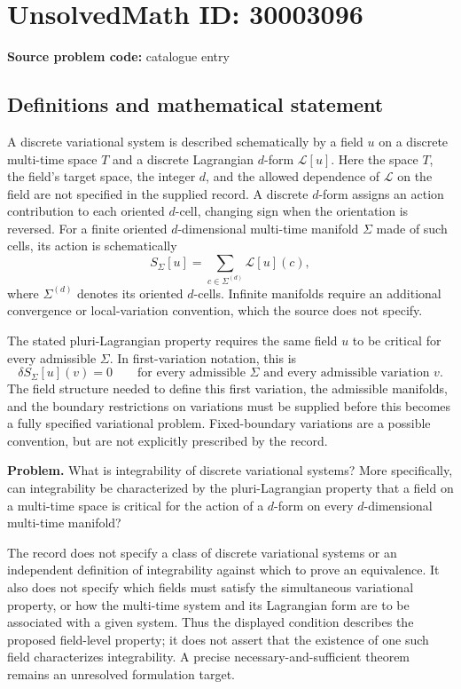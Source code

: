 \documentclass[11pt]{article}
\begin{document}
\section*{UnsolvedMath ID: 30003096}
\textbf{Source problem code:} catalogue entry
\subsection{Definitions and mathematical statement}
A discrete variational system is described schematically by a field \(u\) on a discrete multi-time space \(T\) and a discrete Lagrangian \(d\)-form \(\mathcal L[u]\). Here the space \(T\), the field's target space, the integer \(d\), and the allowed dependence of \(\mathcal L\) on the field are not specified in the supplied record. A discrete \(d\)-form assigns an action contribution to each oriented \(d\)-cell, changing sign when the orientation is reversed. For a finite oriented \(d\)-dimensional multi-time manifold \(\Sigma\) made of such cells, its action is schematically
\[
S_\Sigma[u]=\sum_{c\in\Sigma^{(d)}}\mathcal L[u](c),
\]
where \(\Sigma^{(d)}\) denotes its oriented \(d\)-cells. Infinite manifolds require an additional convergence or local-variation convention, which the source does not specify.

The stated pluri-Lagrangian property requires the same field \(u\) to be critical for every admissible \(\Sigma\). In first-variation notation, this is
\[
\delta S_\Sigma[u](v)=0
\qquad
\text{for every admissible }\Sigma
\text{ and every admissible variation }v.
\]
The field structure needed to define this first variation, the admissible manifolds, and the boundary restrictions on variations must be supplied before this becomes a fully specified variational problem. Fixed-boundary variations are a possible convention, but are not explicitly prescribed by the record.

\textbf{Problem.} What is integrability of discrete variational systems? More specifically, can integrability be characterized by the pluri-Lagrangian property that a field on a multi-time space is critical for the action of a \(d\)-form on every \(d\)-dimensional multi-time manifold?

The record does not specify a class of discrete variational systems or an independent definition of integrability against which to prove an equivalence. It also does not specify which fields must satisfy the simultaneous variational property, or how the multi-time system and its Lagrangian form are to be associated with a given system. Thus the displayed condition describes the proposed field-level property; it does not assert that the existence of one such field characterizes integrability. A precise necessary-and-sufficient theorem remains an unresolved formulation target.
\end{document}

